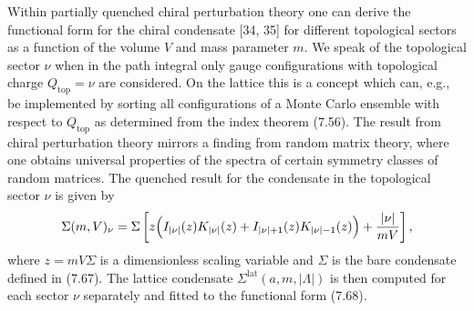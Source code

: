 Within partially quenched chiral perturbation theory one can derive the
functional form for the chiral condensate [34, 35] for different topological
sectors as a function of the volume $V$ and mass parameter $m$. We speak of the
topological sector $\nu$ when in the path integral only gauge configurations
with topological charge $Q_{\mathrm{top}} = \nu$ are considered. On the lattice
this is a concept which can, e.g., be implemented by sorting all configurations
of a Monte Carlo ensemble with respect to $Q_{\mathrm{top}}$ as determined from
the index theorem (7.56). The result from chiral perturbation theory mirrors a
finding from random matrix theory, where one obtains universal properties of
the spectra of certain symmetry classes of random matrices. The quenched result
for the condensate in the topological sector $\nu$ is given by
\begin{equation}
  \Sigma(m, V)_\nu = \Sigma\left[
    z\Bigl(I_{|\nu|}(z)K_{|\nu|}(z) + I_{|\nu|+1}(z)K_{|\nu|-1}(z)\Bigr)
    + \frac{|\nu|}{mV}\right],
\end{equation}
where $z = m V \Sigma$ is a dimensionless scaling variable and $\Sigma$ is the
bare condensate defined in (7.67). The lattice condensate
$\Sigma^{\mathrm{lat}}(a, m, |\Lambda|)$ is then computed for each sector $\nu$
separately and fitted to the functional form (7.68).

